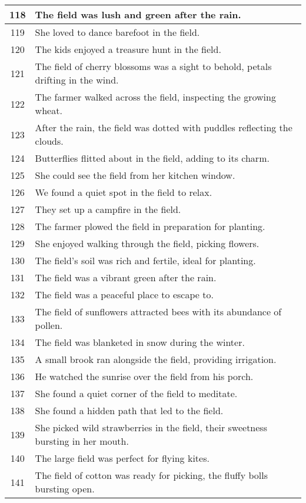 \begin{longtable}{|c|p{12cm}|}
118 & The field was lush and green after the rain. \\ \hline
119 & She loved to dance barefoot in the field. \\ \hline
120 & The kids enjoyed a treasure hunt in the field. \\ \hline
121 & The field of cherry blossoms was a sight to behold, petals drifting in the wind. \\ \hline
122 & The farmer walked across the field, inspecting the growing wheat. \\ \hline
123 & After the rain, the field was dotted with puddles reflecting the clouds. \\ \hline
124 & Butterflies flitted about in the field, adding to its charm. \\ \hline
125 & She could see the field from her kitchen window. \\ \hline
126 & We found a quiet spot in the field to relax. \\ \hline
127 & They set up a campfire in the field. \\ \hline
128 & The farmer plowed the field in preparation for planting. \\ \hline
129 & She enjoyed walking through the field, picking flowers. \\ \hline
130 & The field's soil was rich and fertile, ideal for planting. \\ \hline
131 & The field was a vibrant green after the rain. \\ \hline
132 & The field was a peaceful place to escape to. \\ \hline
133 & The field of sunflowers attracted bees with its abundance of pollen. \\ \hline
134 & The field was blanketed in snow during the winter. \\ \hline
135 & A small brook ran alongside the field, providing irrigation. \\ \hline
136 & He watched the sunrise over the field from his porch. \\ \hline
137 & She found a quiet corner of the field to meditate. \\ \hline
138 & She found a hidden path that led to the field. \\ \hline
139 & She picked wild strawberries in the field, their sweetness bursting in her mouth. \\ \hline
140 & The large field was perfect for flying kites. \\ \hline
141 & The field of cotton was ready for picking, the fluffy bolls bursting open. \\ \hline

\end{longtable}
